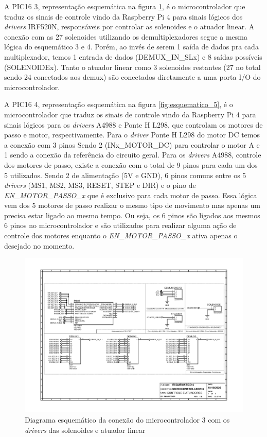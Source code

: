\begin{apendicesenv}
A PIC16 3, representação esquemática na figura \ref{fig:esquematico_4}, é o microcontrolador que traduz os sinais de controle vindo da Raspberry Pi 4 para sinais lógicos dos \textit{drivers} IRF520N, responsáveis por controlar as solenoides e o atuador linear. A conexão com as 27 solenoides utilizando os demultiplexadores segue a mesma lógica do esquemático 3 e 4. Porém, ao invés de serem 1 saída de dados pra cada multiplexador, temos 1 entrada de dados (DEMUX\_IN\_SLx) e 8 saídas possíveis (SOLENOIDEx). Tanto o atuador linear como 3 solenoides restantes (27 no total sendo 24 conectados aos demux) são conectados diretamente a uma porta I/O do microcontrolador.

A PIC16 4, representação esquemática na figura \ref{fig:esquematico_5}, é o microcontrolador que traduz os sinais de controle vindo da Raspberry Pi 4 para sinais lógicos para os \textit{drivers} A4988 e Ponte H L298, que controlam os motores de passo e motor, respectivamente. Para o \textit{driver} Ponte H L298 do motor DC temos a conexão com 3 pinos Sendo 2 (INx\_MOTOR\_DC) para controlar o motor A e 1 sendo a conexão da referência do circuito geral. Para os \textit{drivers} A4988, controle dos motores de passo, existe a conexão com o total de 9 pinos para cada um dos 5 utilizados. Sendo 2 de alimentação (5V e GND), 6 pinos comuns entre os 5 \textit{drivers} (MS1, MS2, MS3, RESET, STEP e DIR) e o pino de \textit{EN\_MOTOR\_PASSO\_x} que é exclusivo para cada motor de passo. Essa lógica vem dos 5 motores de passo realizar o mesmo tipo de movimento mas apenas um precisa estar ligado ao mesmo tempo. Ou seja, os 6 pinos são ligados aos mesmos 6 pinos no microcontrolador e são utilizados para realizar alguma ação de controle dos motores enquanto o \textit{EN\_MOTOR\_PASSO\_x} ativa apenas o desejado no momento.

\begin{landscape}
\begin{figure}[H]
    \centering
    \includegraphics[width=1.25\textwidth, height=2\textheight,keepaspectratio]{figuras/esquematico_eletronica/esquematico_4_micro3.pdf}
    \caption{Diagrama esquemático da conexão do microcontrolador 3 com os \textit{drivers} das solenoides e atuador linear}
    \label{fig:esquematico_4}
\end{figure}
\end{landscape}


\end{apendicesenv}
